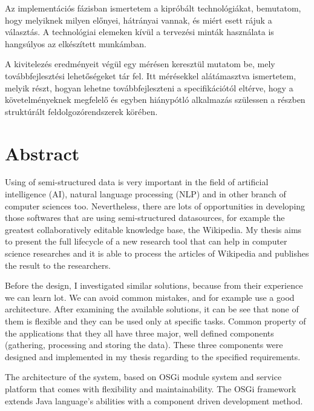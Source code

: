 Az implementációs fázisban ismertetem a kipróbált technológiákat, bemutatom, hogy melyiknek milyen előnyei, hátrányai vannak, és miért esett rájuk a választás. A technológiai elemeken kívül a tervezési minták használata is hangsúlyos az elkészített munkámban.

A kivitelezés eredményeit végül egy mérésen keresztül mutatom be, mely továbbfejlesztési lehetőségeket tár fel. Itt mérésekkel alátámasztva ismertetem, melyik részt, hogyan lehetne továbbfejleszteni a specifikációtól eltérve, hogy a követelményeknek megfelelő és egyben hiánypótló alkalmazás szülessen a részben struktúrált feldolgozórendszerek körében.

\vfill

\chapter*{Abstract}

Using of semi-structured data is very important in the field of artificial intelligence (AI), natural language processing (NLP) and in other branch of computer sciences too. Nevertheless, there are lots of opportunities in developing those softwares that are using semi-structured datasources, for example the greatest collaboratively editable knowledge base, the Wikipedia. My thesis aims to present the full lifecycle of a new research tool that can help in computer science researches and it is able to process the articles of Wikipedia and publishes the result to the researchers.

Before the design, I investigated similar solutions, because from their experience we can learn lot. We can avoid common mistakes, and for example use a good architecture. After examining the available solutions, it can be see that none of them is flexible and they can be used only at specific tasks. Common property of the applications that they all have three major, well defined components (gathering, processing and storing the data). These three components were designed and implemented in my thesis regarding to the specified requirements.

The architecture of the system, based on OSGi module system and service platform that comes with flexibility and maintainability. The OSGi framework extends Java language's abilities with a component driven development method.

